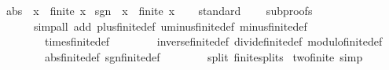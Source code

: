 \begin{isabellebody}
\isamarkupfalse%
\ {\isachardoublequoteopen}abs\ {\isacharequal}{\kern0pt}\ {\isacharparenleft}{\kern0pt}{\isasymlambda}x\ {\isacharcolon}{\kern0pt}{\isacharcolon}{\kern0pt}\ finite{\isacharunderscore}{\kern0pt}{}{\isachardot}{\kern0pt}\ x{\isacharparenright}{\kern0pt}{\isachardoublequoteclose}\isanewline
{}\isamarkupfalse%
\ {\isachardoublequoteopen}sgn\ {\isacharequal}{\kern0pt}\ {\isacharparenleft}{\kern0pt}{\isasymlambda}x\ {\isacharcolon}{\kern0pt}{\isacharcolon}{\kern0pt}\ finite{\isacharunderscore}{\kern0pt}{}{\isachardot}{\kern0pt}\ x{\isacharparenright}{\kern0pt}{\isachardoublequoteclose}\isanewline
{}\isamarkupfalse%
\isanewline
%
\isadelimproof
\ \ %
\endisadelimproof
%
\isatagproof
{}\isamarkupfalse%
\ standard\isanewline
\ \ \ \ {\isacharparenleft}{\kern0pt}subproofs\isanewline
\ \ \ \ \ \ {\isacartoucheopen}simp{\isacharunderscore}{\kern0pt}all\ add{\isacharcolon}{\kern0pt}\ plus{\isacharunderscore}{\kern0pt}finite{\isacharunderscore}{\kern0pt}{}{\isacharunderscore}{\kern0pt}def\ uminus{\isacharunderscore}{\kern0pt}finite{\isacharunderscore}{\kern0pt}{}{\isacharunderscore}{\kern0pt}def\ minus{\isacharunderscore}{\kern0pt}finite{\isacharunderscore}{\kern0pt}{}{\isacharunderscore}{\kern0pt}def\isanewline
\ \ \ \ \ \ \ \ times{\isacharunderscore}{\kern0pt}finite{\isacharunderscore}{\kern0pt}{}{\isacharunderscore}{\kern0pt}def\isanewline
\ \ \ \ \ \ \ \ inverse{\isacharunderscore}{\kern0pt}finite{\isacharunderscore}{\kern0pt}{}{\isacharunderscore}{\kern0pt}def\ divide{\isacharunderscore}{\kern0pt}finite{\isacharunderscore}{\kern0pt}{}{\isacharunderscore}{\kern0pt}def\ modulo{\isacharunderscore}{\kern0pt}finite{\isacharunderscore}{\kern0pt}{}{\isacharunderscore}{\kern0pt}def\isanewline
\ \ \ \ \ \ \ \ abs{\isacharunderscore}{\kern0pt}finite{\isacharunderscore}{\kern0pt}{}{\isacharunderscore}{\kern0pt}def\ sgn{\isacharunderscore}{\kern0pt}finite{\isacharunderscore}{\kern0pt}{}{\isacharunderscore}{\kern0pt}def\isanewline
\ \ \ \ \ \ \ \ split{\isacharcolon}{\kern0pt}\ finite{\isacharunderscore}{\kern0pt}{}{\isachardot}{\kern0pt}splits{\isacartoucheclose}{\isacharparenright}{\kern0pt}%
\endisatagproof
{\isafoldproof}%
%
\isadelimproof
\isanewline
%
\endisadelimproof
{}\isamarkupfalse%
\isanewline
\isanewline
{}\isamarkupfalse%
\ two{\isacharunderscore}{\kern0pt}finite{\isacharunderscore}{\kern0pt}{}\ {\isacharbrackleft}{\kern0pt}simp{\isacharbrackright}{\kern0pt}{\isacharcolon}{\kern0pt}\isanewline

\end{isabellebody}
